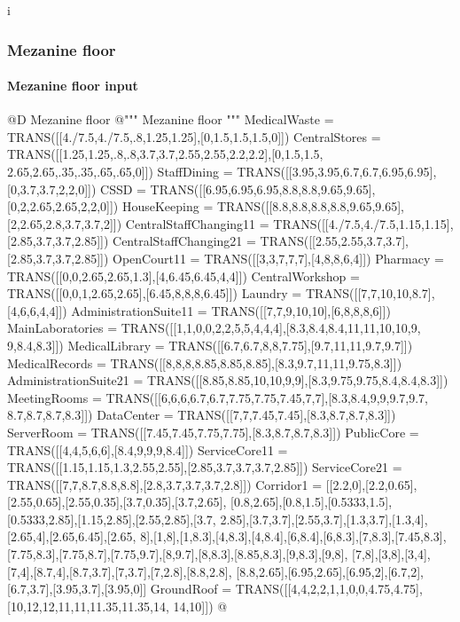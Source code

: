 i\documentclass[11pt,oneside]{article}    %
\begin{document}
\subsubsection{Mezanine floor}
\paragraph{Mezanine floor input}

@D Mezanine floor
@{""" Mezanine floor """
MedicalWaste = TRANS([[4./7.5,4./7.5,.8,1.25,1.25],[0,1.5,1.5,1.5,0]])
CentralStores = TRANS([[1.25,1.25,.8,.8,3.7,3.7,2.55,2.55,2.2,2.2],[0,1.5,1.5,
    2.65,2.65,.35,.35,.65,.65,0]])
StaffDining = TRANS([[3.95,3.95,6.7,6.7,6.95,6.95],[0,3.7,3.7,2,2,0]])
CSSD = TRANS([[6.95,6.95,6.95,8.8,8.8,9.65,9.65],[0,2,2.65,2.65,2,2,0]])
HouseKeeping = TRANS([[8.8,8.8,8.8,8.8,9.65,9.65],[2,2.65,2.8,3.7,3.7,2]])
CentralStaffChanging11 = TRANS([[4./7.5,4./7.5,1.15,1.15],[2.85,3.7,3.7,2.85]])
CentralStaffChanging21 = TRANS([[2.55,2.55,3.7,3.7],[2.85,3.7,3.7,2.85]])
OpenCourt11 = TRANS([[3,3,7,7,7],[4,8,8,6,4]])
Pharmacy = TRANS([[0,0,2.65,2.65,1.3],[4,6.45,6.45,4,4]])
CentralWorkshop = TRANS([[0,0,1,2.65,2.65],[6.45,8,8,8,6.45]])
Laundry = TRANS([[7,7,10,10,8.7],[4,6,6,4,4]])
AdministrationSuite11 = TRANS([[7,7,9,10,10],[6,8,8,8,6]])
MainLaboratories = TRANS([[1,1,0,0,2,2,5,5,4,4,4],[8.3,8.4,8.4,11,11,10,10,9,
    9,8.4,8.3]])
MedicalLibrary = TRANS([[6.7,6.7,8,8,7.75],[9.7,11,11,9.7,9.7]])
MedicalRecords = TRANS([[8,8,8,8.85,8.85,8.85],[8.3,9.7,11,11,9.75,8.3]])
AdministrationSuite21 = TRANS([[8.85,8.85,10,10,9,9],[8.3,9.75,9.75,8.4,8.4,8.3]])
MeetingRooms = TRANS([[6,6,6,6.7,6.7,7.75,7.75,7.45,7,7],[8.3,8.4,9,9,9.7,9.7,
    8.7,8.7,8.7,8.3]])
DataCenter = TRANS([[7,7,7.45,7.45],[8.3,8.7,8.7,8.3]])
ServerRoom = TRANS([[7.45,7.45,7.75,7.75],[8.3,8.7,8.7,8.3]])
PublicCore = TRANS([[4,4,5,6,6],[8.4,9,9,9,8.4]])
ServiceCore11 = TRANS([[1.15,1.15,1.3,2.55,2.55],[2.85,3.7,3.7,3.7,2.85]])
ServiceCore21 = TRANS([[7,7,8.7,8.8,8.8],[2.8,3.7,3.7,3.7,2.8]])
Corridor1 = [[2.2,0],[2.2,0.65],[2.55,0.65],[2.55,0.35],[3.7,0.35],[3.7,2.65],
    [0.8,2.65],[0.8,1.5],[0.5333,1.5],[0.5333,2.85],[1.15,2.85],[2.55,2.85],[3.7,
    2.85],[3.7,3.7],[2.55,3.7],[1.3,3.7],[1.3,4],[2.65,4],[2.65,6.45],[2.65,
    8],[1,8],[1,8.3],[4,8.3],[4,8.4],[6,8.4],[6,8.3],[7,8.3],[7.45,8.3],
    [7.75,8.3],[7.75,8.7],[7.75,9.7],[8,9.7],[8,8.3],[8.85,8.3],[9,8.3],[9,8],
    [7,8],[3,8],[3,4],[7,4],[8.7,4],[8.7,3.7],[7,3.7],[7,2.8],[8.8,2.8],
    [8.8,2.65],[6.95,2.65],[6.95,2],[6.7,2],[6.7,3.7],[3.95,3.7],[3.95,0]]
GroundRoof = TRANS([[4,4,2,2,1,1,0,0,4.75,4.75],[10,12,12,11,11,11.35,11.35,14,
    14,10]])
@}
\end{document}
